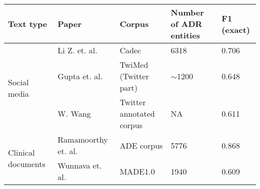 

\begin{tabular}{|l|l|l|l|l|}
\hline
\textbf{Text type}                           & \textbf{Paper}                                  & \textbf{Corpus}          & \textbf{Number of ADR entities} & \textbf{F1 (exact)} \\ \hline
\multirow{3}{*}{Social media}       & Li Z. et. al.~\cite{li2020lexicon}              & Cadec                    & 6318                            & 0.706               \\ \cline{2-5} 
                                    & Gupta et. al.~\cite{gupta2018multi}             & TwiMed (Twitter part)    & $\sim$1200                      & 0.648               \\ \cline{2-5} 
                                    & W. Wang~\cite{wang2016mining}                   & Twitter annotated corpus & NA                              & 0.611               \\ \hline
\multirow{2}{*}{Clinical documents} & Ramamoorthy et. al.~\cite{li2017neural}         & ADE corpus               & 5776                            & 0.868               \\ \cline{2-5} 
                                    & Wunnava et. al.~\cite{wunnava2018bidirectional} & MADE1.0                  & 1940                            & 0.609               \\ \hline
\end{tabular}
